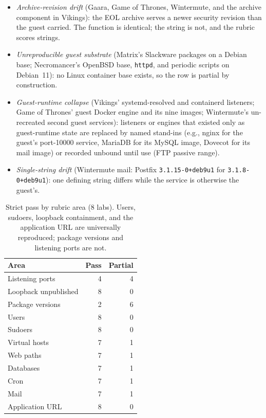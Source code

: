 \documentclass[3p,twocolumn,authoryear]{elsarticle}
\begin{document}
\begin{itemize}
\item \emph{Archive-revision drift} (Gaara, Game of Thrones, Wintermute,
and the archive component in Vikings): the EOL archive serves a newer
security revision than the guest carried. The function is identical;
the string is not, and the rubric scores strings.
\item \emph{Unreproducible guest substrate} (Matrix's Slackware packages on a Debian base; Necromancer's OpenBSD base, \texttt{httpd},
and periodic scripts on Debian~11): no Linux container base exists, so
the row is partial by construction.
\item \emph{Guest-runtime collapse} (Vikings' systemd-resolved and
containerd listeners; Game of Thrones' guest Docker engine and its
nine images; Wintermute's un-recreated second guest services):
listeners or engines that existed only as guest-runtime state are
replaced by named stand-ins (e.g., nginx for the guest's port-10000
service, MariaDB for its MySQL image, Dovecot for its mail image) or
recorded unbound until use (FTP passive range).
\item \emph{Single-string drift} (Wintermute mail: Postfix
\texttt{3.1.15-0+deb9u1} for \texttt{3.1.8-0+deb9u1}): one defining
string differs while the service is otherwise the guest's.
\end{itemize}

\begin{table}[tbp]
\caption{Strict pass by rubric area (8 labs). Users, sudoers, loopback
containment, and the application URL are universally reproduced;
package versions and listening ports are not.}
\label{tab:areas}
\centering\footnotesize
\begin{tabularx}{\columnwidth}{Xrr}
\toprule
Area & Pass & Partial\\
\midrule
Listening ports & 4 & 4\\
Loopback unpublished & 8 & 0\\
Package versions & 2 & 6\\
Users & 8 & 0\\
Sudoers & 8 & 0\\
Virtual hosts & 7 & 1\\
Web paths & 7 & 1\\
Databases & 7 & 1\\
Cron & 7 & 1\\
Mail & 7 & 1\\
Application URL & 8 & 0\\
\bottomrule
\end{tabularx}
\end{table}
\end{document}
